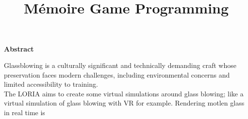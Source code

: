 \documentclass{rapportcs}
\title{Mémoire Game Programming}
\begin{document}




    




\fairemarges %
\fairepagedegarde %


\begin{center}
    \textbf{Abstract}
\end{center}

\vspace{1em} %

        Glassblowing is a culturally significant and technically demanding craft whose preservation faces modern challenges, including environmental concerns and limited accessibility to training. \\

        The LORIA aims to create some virtual simulations around glass blowing; like a virtual simulation of glass blowing with VR for example. Rendering motlen glass in real time is 
        
\end{document}
